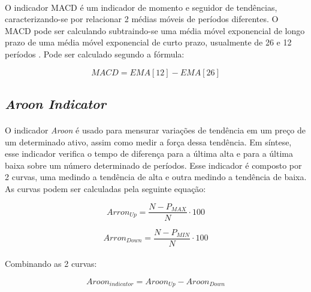 \documentclass[grad,numbers]{coppe}
\begin{document}
            \paragraph{}O indicador MACD é um indicador de momento e seguidor de tendências, caracterizando-se por relacionar 2 médias móveis de períodos diferentes. O MACD pode ser calculando subtraindo-se uma média móvel exponencial de longo prazo de uma média móvel exponencial de curto prazo, usualmente de 26 e 12 períodos \cite{macd-indicator}. Pode ser calculado segundo a fórmula:
            
            \begin{equation}
                MACD = EMA[12] - EMA[26]
            \end{equation}
            
        \subsection{\textit{Aroon Indicator}}
            \paragraph{}O indicador \textit{Aroon} é usado para mensurar variações de tendência em um preço de um determinado ativo, assim como medir a força dessa tendência. Em síntese, esse indicador verifica o tempo de diferença para a última alta e para a última baixa sobre um número determinado de períodos. Esse indicador é composto por 2 curvas, uma medindo a tendência de alta e outra medindo a tendência de baixa. As curvas podem ser calculadas pela seguinte equação:
            
            \begin{equation}
                Arron_{Up} = \frac{N - P_{MAX}}{N} \cdot 100
            \end{equation}
            
            \begin{equation}
                Arron_{Down} = \frac{N - P_{MIN}}{N} \cdot 100
            \end{equation}
            
            \paragraph{}Combinando as 2 curvas:
            
            \begin{equation}
                Aroon_{indicator} = Aroon_{Up} - Aroon_{Down}
            \end{equation}
            
\end{document}
